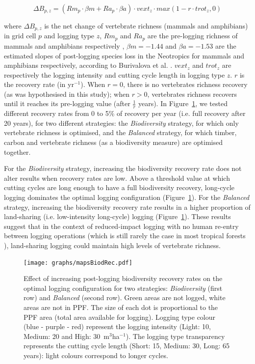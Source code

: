 \documentclass[12pt]{article}
\begin{document}
\begin{equation}
\Delta B_{p,z} = \left(Rm_{p} \cdot \beta m + Ra_{p} \cdot \beta a  \right)  \cdot vext_z \cdot max(1 - r \cdot trot_z, 0)
\end{equation}
 
where $\Delta B_{p,z}$ is the net change of vertebrate richness (mammals and amphibians) in grid cell $p$ and logging type $z$, $Rm_{p}$ and $Ra_p$ are the pre-logging richness of mammals and amphibians respectively \cite{Jenkins2013}, $\beta m = - 1.44$ and $\beta a = - 1.53$  are the estimated slopes of post-logging species loss in the Neotropics for mammals and amphibians respectively, according to Burivalova et al. \cite{Burivalova2014}. $vext_z$ and $trot_z$ are respectively the logging intensity and cutting cycle length in logging type $z$. $r$ is the recovery rate (in yr$^{-1}$). When $r=0$, there is no vertebrates richness recovery (as was hypothesised in this study); when $r>0$, vertebrates richness recovers until it reaches its pre-logging value (after $\frac{1}{r}$ years). In Figure~\ref{fig:mapsBioDRec}, we tested different recovery rates from 0 to 5\% of recovery per year (i.e. full recovery after 20 years), for two different strategies: the \textit{Biodiversity} strategy, for which only vertebrate richness is optimised, and the \textit{Balanced} strategy, for which timber, carbon and vertebrate richness (as a biodiversity measure) are optimised together. 

For the \textit{Biodiversity} strategy, increasing the biodiversity recovery rate does not alter results when recovery rates are low. Above a threshold value at which cutting cycles are long enough to have a full biodiversity recovery, long-cycle logging dominates the optimal logging configuration (Figure~\ref{fig:mapsBioDRec}). For the \textit{Balanced} strategy, increasing the biodiversity recovery rate results in a higher proportion of land-sharing (i.e. low-intensity long-cycle) logging (Figure~\ref{fig:mapsBioDRec}). These results suggest that in the context of reduced-impact logging with no human re-entry between logging operations \cite{Bicknell2015,Brodie2015} (which is still rarely the case in most tropical forests \cite{Lewis2015}), land-sharing logging could maintain high levels of vertebrate richness.

\begin{figure}
    \centering
    \texttt{[image: graphs/mapsBiodRec.pdf]}
    \caption{Effect of increasing post-logging biodiversity recovery rates on the optimal logging configuration for two strategies: \textit{Biodiversity} (first row) and \textit{Balanced} (second row). Green areas are not logged, white areas are not in PPF. The size of each dot is proportional to the PPF area (total area available for logging). Logging type colour (blue - purple - red) represent the logging intensity (Light: 10, Medium: 20 and High: 30~m$^3$ha$^{-1}$). The logging type transparency represents the cutting cycle length (Short: 15, Medium: 30, Long: 65 years): light colours correspond to longer cycles.}
    \label{fig:mapsBioDRec}
\end{figure}
\end{document}
